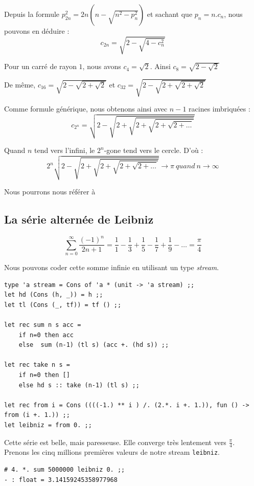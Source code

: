 \vspace{1cm}
Depuis la formule $  p_{2n}^2 = 2n (n - \sqrt{n^2-p_n^2})  $ et sachant que $p_n = n.c_n$, 
nous pouvons en déduire :
$$ c_{2n} = \sqrt{2-\sqrt{4-c_n^2}} $$

Pour un carré de rayon $1$, nous avons $c_4=\sqrt{2}$. Ainsi $c_8= \sqrt{2-\sqrt{2}}$

De même, $c_{16}=\sqrt{2-\sqrt{2+\sqrt{2}}} $  et $c_{32}=\sqrt{2-\sqrt{2+\sqrt{2+\sqrt2}}} $

Comme formule générique, nous obtenons ainsi avec $n-1$ racines imbriquées :
$$c_{2^n}=\sqrt{2-\sqrt{2+\sqrt{2+\sqrt{2+\sqrt{2+\dots}}}}}$$ 

Quand $n$ tend vers l'infini, le $2^n$-gone tend vers le cercle. D'où :
$$ 2^n \sqrt{2-\sqrt{2+\sqrt{2+\sqrt{2+\sqrt{2+\dots}}}}} \rightarrow \pi\ quand\ n \rightarrow \infty $$

Nous pourrons nous référer à \cite{wm}


\subsection{La série alternée de Leibniz}
\[ \sum_{n=0}^\infty \frac{(-1)^n}{2n+1} = \frac{1}{1} -\frac{1}{3}+\frac{1}{5}-\frac{1}{7}+\frac{1}{9} - \dots = \frac{\pi}{4}  \]

Nous pouvons coder cette somme infinie en utilisant un type \textit{stream}. 

\begin{verbatim}
type 'a stream = Cons of 'a * (unit -> 'a stream) ;;
let hd (Cons (h, _)) = h ;;
let tl (Cons (_, tf)) = tf () ;;

let rec sum n s acc =
	if n=0 then acc
	else  sum (n-1) (tl s) (acc +. (hd s)) ;;

let rec take n s =
	if n=0 then []
	else hd s :: take (n-1) (tl s) ;;

let rec from i = Cons ((((-1.) ** i ) /. (2.*. i +. 1.)), fun () -> from (i +. 1.)) ;;
let leibniz = from 0. ;;
\end{verbatim}


Cette série est belle, mais paresseuse. Elle converge très lentement vers $\frac{\pi}{4}$. 
Prenons les cinq millions premières valeurs de notre stream \verb+leibniz+.
\begin{verbatim}
# 4. *. sum 5000000 leibniz 0. ;;
- : float = 3.14159245358977968
\end{verbatim}

